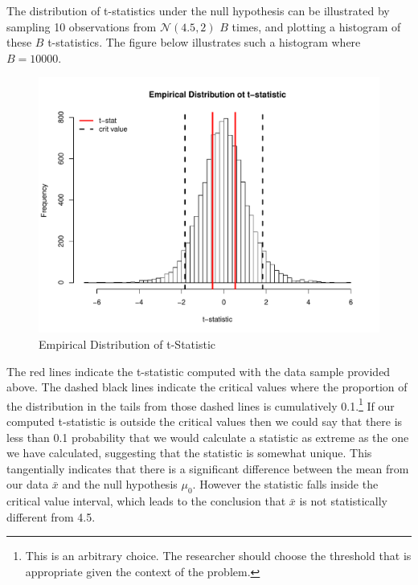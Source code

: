 \documentclass[12pt]{article}
\begin{document}
\noindent The distribution of t-statistics under the null hypothesis can be illustrated by sampling 10 observations from $\mathcal{N}(4.5,2)$ $B$ times, and plotting a histogram of these $B$ t-statistics. The figure below illustrates such a histogram where $B = 10000$.

\begin{figure}[H]\caption[]{Empirical Distribution of t-Statistic}
\centering
\begin{minipage}{0.6\linewidth}
\includegraphics[trim={0cm 0cm 0cm 1.5cm}, clip, scale=0.6]{../figs/ttest_dist.pdf}
\end{minipage}
\end{figure}

\noindent The red lines indicate the t-statistic computed with the data sample provided above. The dashed black lines indicate the critical values where the proportion of the distribution in the tails from those dashed lines is cumulatively 0.1.\footnote{This is an arbitrary choice. The researcher should choose the threshold that is appropriate given the context of the problem.} If our computed t-statistic is outside the critical values then we could say that there is less than 0.1 probability that we would calculate a statistic as extreme as the one we have calculated, suggesting that the statistic is somewhat unique. This tangentially indicates that there is a significant difference between the mean from our data $\bar{x}$ and the null hypothesis $\mu_0$. However the statistic falls inside the critical value interval, which leads to the conclusion that $\bar{x}$ is not statistically different from 4.5. \\
\end{document}
